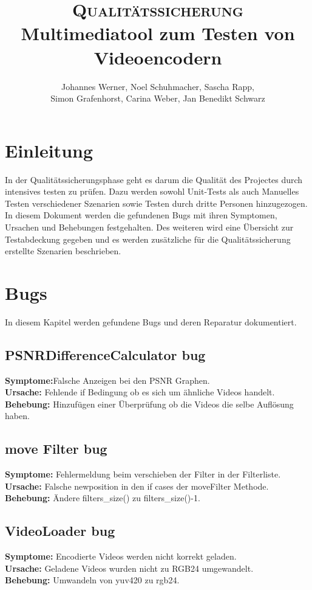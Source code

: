 \documentclass{scrartcl}
\title{\fontsize{40}{48} \selectfont \textsc{Qualitätssicherung}\\
{\fontsize{18}{18} \selectfont Multimediatool zum Testen von Videoencodern}}}
\author {Johannes Werner, Noel Schuhmacher, Sascha Rapp,\\ Simon Grafenhorst,
Carina Weber, Jan Benedikt Schwarz}
\begin{document}
 {
\maketitle
\thispagestyle{empty}
\pagestyle{empty}
\newpage
\setcounter{page}{0}
\tableofcontents
\clearpage
\pagestyle{plain}
\newpage
\section{Einleitung}
In der Qualitätssicherungsphase geht es darum die Qualität des Projectes  durch intensives testen zu prüfen. Dazu werden sowohl Unit-Tests als auch Manuelles Testen verschiedener Szenarien sowie Testen durch dritte Personen hinzugezogen.\\
In diesem Dokument werden die gefundenen Bugs mit ihren Symptomen, Ursachen und Behebungen festgehalten. Des weiteren wird eine Übersicht zur Testabdeckung gegeben und es werden zusätzliche für die Qualitätssicherung erstellte Szenarien beschrieben.


\newpage
\section{Bugs}
In diesem Kapitel werden gefundene Bugs und deren Reparatur dokumentiert.
\subsection{PSNRDifferenceCalculator bug}
\textbf{Symptome:}Falsche Anzeigen bei den PSNR Graphen.\\
\textbf{Ursache:} Fehlende if Bedingung ob es sich um ähnliche Videos handelt.\\
\textbf{Behebung:} Hinzufügen einer Überprüfung ob die Videos die selbe Auflösung haben.
\subsection{move Filter bug}
\textbf{Symptome:} Fehlermeldung beim verschieben der Filter in der Filterliste.\\
\textbf{Ursache:} Falsche newposition in den if cases der moveFilter Methode.\\
\textbf{Behebung:} Ändere filters\_size() zu filters\_size()-1.
\subsection{VideoLoader bug}
\textbf{Symptome:}
Encodierte Videos werden nicht korrekt geladen.\\
\textbf{Ursache:}
Geladene Videos wurden nicht zu RGB24 umgewandelt.\\
\textbf{Behebung:}
Umwandeln von yuv420 zu rgb24.
}
\end{document}
